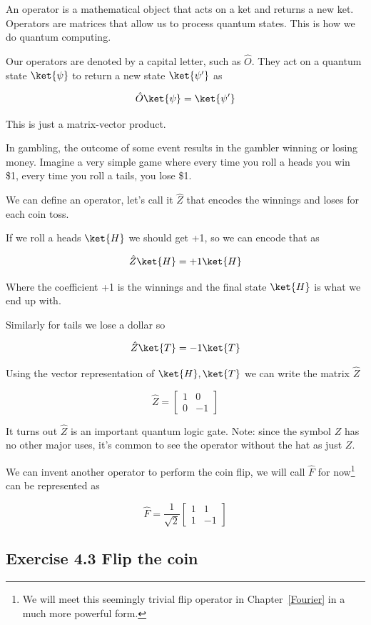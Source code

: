 \documentclass{book}
\begin{document}
An operator is a mathematical object that acts on a ket and returns a new ket. Operators are matrices that allow us to process quantum states. This is how we do quantum computing. 

Our operators are denoted by a capital letter, such as  $\hat{O}$. They act on a quantum state $\ket{\psi}$ to return a new state $\ket{\psi'}$ as 

$$\hat{O}\ket{\psi} = \ket{\psi'}$$

This is just a matrix-vector product. 

In gambling, the outcome of some event results in the gambler winning or losing money. Imagine a very simple game where every time you roll a heads you win \$1, every time you roll a tails, you lose \$1. 

We can define an operator, let's call it $\hat{Z}$ that encodes the winnings and loses for each coin toss. 

If we roll a heads $\ket{H}$ we should get +1, so we can encode that as 

$$
\hat{Z}\ket{H} = +1 \ket{H}
$$

Where the coefficient +1 is the winnings and the final state $\ket{H}$ is what we end up with. 

Similarly for tails we lose a dollar so 

$$
\hat{Z}\ket{T} = -1 \ket{T}
$$

Using the vector representation of $\ket{H}, \ket{T}$ we can write the matrix $\hat{Z}$

$$ \hat{Z} = \begin{bmatrix} 1 & 0 \\ 0 & -1 \end{bmatrix} $$

It turns out $\hat{Z}$ is an important quantum logic gate. Note: since the symbol $Z$ has no other major uses, it's common to see the operator without the hat as just $Z$.


We can invent another operator to perform the coin flip, we will call $\hat{F}$ for now\footnote{We will meet this seemingly trivial flip operator in Chapter~\ref{Fourier} in a much more powerful form.} can be represented as 

$$
\hat{F} =  \frac{1}{\sqrt{2}} \begin{bmatrix} 1 & 1 \\ 1 & -1 \end{bmatrix}
$$

\subsection{Exercise 4.3 Flip the coin}   
\end{document}
